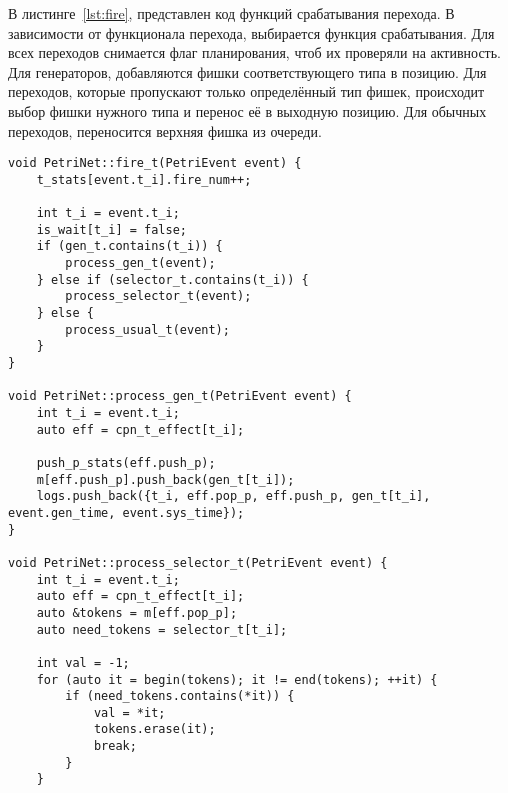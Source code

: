 В листинге~\ref{lst:fire}, представлен код функций срабатывания перехода. В зависимости от функционала перехода, выбирается функция срабатывания. Для всех переходов снимается флаг планирования, чтоб их проверяли на активность. Для генераторов, добавляются фишки соответствующего типа в позицию. Для переходов, которые пропускают только определённый тип фишек, происходит выбор фишки нужного типа и перенос её в выходную позицию. Для обычных переходов, переносится верхняя фишка из очереди.
\clearpage

\begin{center}
	\captionsetup{justification=raggedright,singlelinecheck=off}
	\begin{lstlisting}[label=lst:fire,caption=Функции срабатывания перехода ,showstringspaces=false]
void PetriNet::fire_t(PetriEvent event) {
	t_stats[event.t_i].fire_num++;
	
	int t_i = event.t_i;
	is_wait[t_i] = false;
	if (gen_t.contains(t_i)) {
		process_gen_t(event);
	} else if (selector_t.contains(t_i)) {
		process_selector_t(event);
	} else {
		process_usual_t(event);
	}
}

void PetriNet::process_gen_t(PetriEvent event) {
	int t_i = event.t_i;
	auto eff = cpn_t_effect[t_i];
	
	push_p_stats(eff.push_p);
	m[eff.push_p].push_back(gen_t[t_i]);
	logs.push_back({t_i, eff.pop_p, eff.push_p, gen_t[t_i], event.gen_time, event.sys_time});
}

void PetriNet::process_selector_t(PetriEvent event) {
	int t_i = event.t_i;
	auto eff = cpn_t_effect[t_i];
	auto &tokens = m[eff.pop_p];
	auto need_tokens = selector_t[t_i];
	
	int val = -1;
	for (auto it = begin(tokens); it != end(tokens); ++it) {
		if (need_tokens.contains(*it)) {
			val = *it;
			tokens.erase(it);
			break;
		}
	}
	\end{lstlisting}
\end{center}
\FloatBarrier
\clearpage

